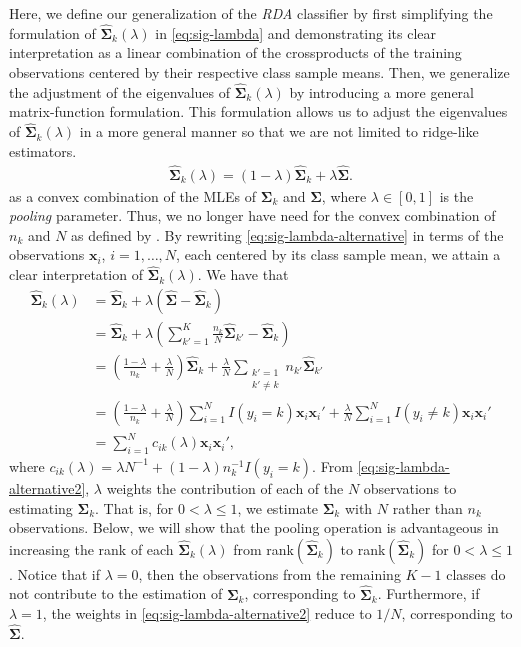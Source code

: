 \documentclass[11pt]{article}
\begin{document}
Here, we define our generalization of the \emph{RDA} classifier by first simplifying the formulation of $\widehat{\bm \Sigma}_k(\lambda)$ in \eqref{eq:sig-lambda} and demonstrating its clear interpretation as a linear combination of the crossproducts of the training observations centered by their respective class sample means. Then, we generalize the adjustment of the eigenvalues of $\widehat{\bm \Sigma}_k(\lambda)$ by introducing a more general matrix-function formulation. This formulation allows us to adjust the eigenvalues of $\widehat{\bm \Sigma}_k(\lambda)$ in a more general manner so that we are not limited to ridge-like estimators.
\begin{align}
  \widehat{\bm\Sigma}_k(\lambda) = (1 - \lambda) \widehat{\bm\Sigma}_k + \lambda \widehat{\bm\Sigma}.\label{eq:sig-lambda-alternative}
\end{align}
as a convex combination of the MLEs of $\bm \Sigma_k$ and $\bm \Sigma$, where $\lambda \in [0, 1]$ is the \emph{pooling} parameter. Thus, we no longer have need for the convex combination of $n_k$ and $N$ as defined by \cite{Friedman:1989tm}. By rewriting \eqref{eq:sig-lambda-alternative} in terms of the observations $\bm x_i$, $i = 1, \ldots, N$, each centered by its class sample mean, we attain a clear interpretation of $\widehat{\bm\Sigma}_k(\lambda)$. We have that
\begin{align}
	\widehat{\bm\Sigma}_k(\lambda) &= \widehat{\bm\Sigma}_k + \lambda (\widehat{\bm\Sigma} - \widehat{\bm\Sigma}_k) \nonumber\\
	&= \widehat{\bm\Sigma}_k + \lambda \left(\sum_{k' = 1}^K \frac{n_k}{N} \widehat{\bm\Sigma}_{k'}  - \widehat{\bm\Sigma}_k \right) \nonumber\\
	&= \left( \frac{1 - \lambda}{n_k} + \frac{\lambda}{N} \right) \widehat{\bm\Sigma}_k +  \frac{\lambda}{N} \sum_{\substack{k' = 1\\k' \ne k}} n_{k'} \widehat{\bm\Sigma}_{k'} \nonumber \\
	&= \left( \frac{1 - \lambda}{n_k} + \frac{\lambda}{N} \right)\sum_{i=1}^N I(y_i = k) \bm x_i \bm x_i' +  \frac{\lambda}{N} \sum_{i=1}^N I(y_i \ne k) \bm x_i \bm x_i' \nonumber \\
	&= \sum_{i=1}^N c_{ik}(\lambda) \bm x_i \bm x_i',\label{eq:sig-lambda-alternative2}
\end{align}
where $c_{ik}(\lambda) = \lambda N^{-1} + (1 - \lambda)n_k^{-1}I(y_i = k)$.
From \eqref{eq:sig-lambda-alternative2}, $\lambda$ weights the contribution of each of the $N$ observations to estimating $\bm \Sigma_k$. That is, for $0 < \lambda \le 1$, we estimate $\bm \Sigma_k$ with $N$ rather than $n_k$ observations. Below, we will show that the pooling operation is advantageous in increasing the rank of each $\widehat{\bm\Sigma}_k(\lambda)$ from rank$(\widehat{\bm\Sigma}_k)$ to rank$(\widehat{\bm\Sigma}_k)$ for $0 < \lambda \le 1$. Notice that if $\lambda  = 0$, then the observations from the remaining $K - 1$ classes do not contribute to the estimation of $\bm \Sigma_k$, corresponding to $\widehat{\bm \Sigma}_k$. Furthermore, if $\lambda = 1$, the weights in \eqref{eq:sig-lambda-alternative2} reduce to $1/N$, corresponding to $\widehat{\bm\Sigma}$.
\end{document}
